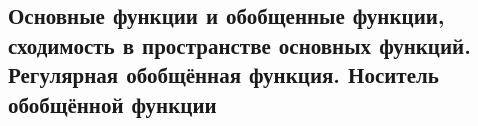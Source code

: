 \subsection{Основные функции и обобщенные функции, сходимость в пространстве основных функций. Регулярная обобщённая функция. Носитель обобщённой функции}
